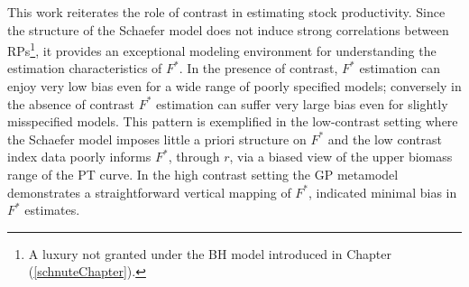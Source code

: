 
This work reiterates the role of contrast 
\cite{hilborn_quantitative_1992} in estimating stock productivity. 
Since the structure of the Schaefer model does not induce strong correlations
between RPs\footnote{A luxury not granted under the BH model introduced
in Chapter (\ref{schnuteChapter}).}, it provides an exceptional modeling 
environment for understanding the estimation characteristics of $F^*$. In the 
presence of contrast, $F^*$ estimation can enjoy very low bias even for a wide 
range of poorly specified models; conversely in the absence of contrast $F^*$ 
estimation can suffer very large bias even for slightly misspecified models.
This pattern is exemplified in the low-contrast setting where the Schaefer 
model imposes little a priori structure on $F^*$ and the low contrast index 
data poorly informs $F^*$, through $r$, via a biased view of the upper biomass 
range of the PT curve.
In the high contrast setting the GP metamodel demonstrates a straightforward 
vertical mapping of $F^*$, indicated minimal bias in $F^*$ estimates.

